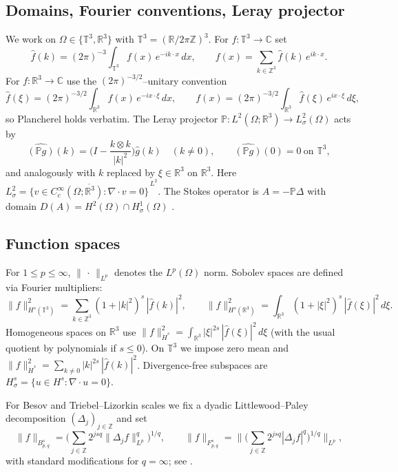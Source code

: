 \IfFileExists{nyjm.cls}{\documentclass[11pt]{nyjm}}{\documentclass[11pt]{amsart}}
\newcommand{\R}{\mathbb{R}}
\newcommand{\T}{\mathbb{T}}
\theoremstyle{plain}
\theoremstyle{definition}
\theoremstyle{remark}
\begin{document}
\subsection{Domains, Fourier conventions, Leray projector}\label{subsec:fourier}
We work on $\Omega\in\{\T^3,\R^3\}$ with $\T^3=(\R/2\pi\mathbb Z)^3$.
For $f:\T^3\to\mathbb C$ set
\[
  \widehat f(k)=(2\pi)^{-3}\!\int_{\T^3} f(x)\,e^{-i k\cdot x}\,dx,
  \qquad
  f(x)=\sum_{k\in\mathbb Z^3}\widehat f(k)\,e^{i k\cdot x}.
\]
For $f:\R^3\to\mathbb C$ use the $(2\pi)^{-3/2}$–unitary convention
\[
  \widehat f(\xi)=(2\pi)^{-3/2}\!\int_{\R^3} f(x)\,e^{-i x\cdot \xi}\,dx,
  \qquad
  f(x)=(2\pi)^{-3/2}\!\int_{\R^3} \widehat f(\xi)\,e^{i x\cdot \xi}\,d\xi,
\]
so Plancherel holds verbatim. The Leray projector $\mathbb P:L^2(\Omega;\R^3)\to L^2_\sigma(\Omega)$ acts by
\[
  \widehat{(\mathbb P g)}(k)=\Big(I-\frac{k\otimes k}{|k|^2}\Big)\widehat g(k)\quad(k\neq0),\qquad
  \widehat{(\mathbb P g)}(0)=0\ \text{on }\T^3,
\]
and analogously with $k$ replaced by $\xi\in\R^3$ on $\R^3$. Here
$L^2_\sigma=\overline{\{v\in C_c^\infty(\Omega;\R^3):\nabla\!\cdot v=0\}}^{\,L^2}$.
The Stokes operator is $A=-\mathbb P\Delta$ with domain
$D(A)=H^2(\Omega)\cap H^1_\sigma(\Omega)$ \cite{Temam2001,Lemarie2002}.

\subsection{Function spaces}\label{subsec:spaces}
For $1\le p\le\infty$, $\|\,\cdot\,\|_{L^p}$ denotes the $L^p(\Omega)$ norm. Sobolev spaces are defined via Fourier multipliers:
\[
  \|f\|_{H^s(\T^3)}^2=\sum_{k\in\mathbb Z^3}(1+|k|^2)^s\,|\widehat f(k)|^2,\qquad
  \|f\|_{H^s(\R^3)}^2=\int_{\R^3}(1+|\xi|^2)^s\,|\widehat f(\xi)|^2\,d\xi.
\]
Homogeneous spaces on $\R^3$ use
$\|f\|_{\dot H^s}^2=\int_{\R^3}|\xi|^{2s}\,|\widehat f(\xi)|^2\,d\xi$
(with the usual quotient by polynomials if $s\le0$). On $\T^3$ we impose zero mean and
$\|f\|_{\dot H^s}^2=\sum_{k\neq0}|k|^{2s}\,|\widehat f(k)|^2$.
Divergence-free subspaces are $H^s_\sigma=\{u\in H^s:\nabla\!\cdot u=0\}$.

For Besov and Triebel–Lizorkin scales we fix a dyadic Littlewood–Paley decomposition $(\Delta_j)_{j\in\mathbb Z}$ and set
\[
  \|f\|_{B^s_{p,q}}=\Big(\sum_{j\in\mathbb Z}2^{j s q}\|\Delta_j f\|_{L^p}^q\Big)^{1/q},\qquad
  \|f\|_{F^s_{p,q}}=\Big\|\Big(\sum_{j\in\mathbb Z}2^{j s q}|\Delta_j f|^q\Big)^{1/q}\Big\|_{L^p},
\]
with standard modifications for $q=\infty$; see \cite{BahouriCheminDanchin2011}.
\end{document}
